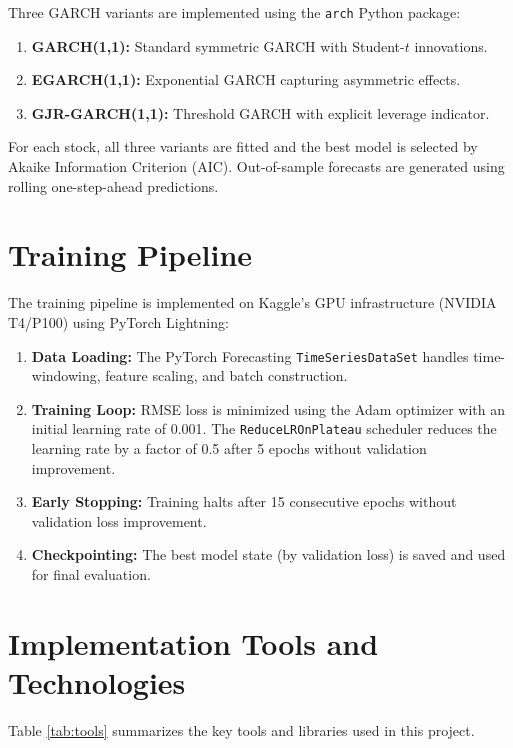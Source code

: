 Three GARCH variants are implemented using the \texttt{arch} Python package:

\begin{enumerate}
    \item \textbf{GARCH(1,1):} Standard symmetric GARCH with Student-$t$ innovations.
    \item \textbf{EGARCH(1,1):} Exponential GARCH capturing asymmetric effects.
    \item \textbf{GJR-GARCH(1,1):} Threshold GARCH with explicit leverage indicator.
\end{enumerate}

For each stock, all three variants are fitted and the best model is selected by Akaike Information Criterion (AIC). Out-of-sample forecasts are generated using rolling one-step-ahead predictions.

\section{Training Pipeline}

The training pipeline is implemented on Kaggle's GPU infrastructure (NVIDIA T4/P100) using PyTorch Lightning:

\begin{enumerate}
    \item \textbf{Data Loading:} The PyTorch Forecasting \texttt{TimeSeriesDataSet} handles time-windowing, feature scaling, and batch construction.
    \item \textbf{Training Loop:} RMSE loss is minimized using the Adam optimizer with an initial learning rate of 0.001. The \texttt{ReduceLROnPlateau} scheduler reduces the learning rate by a factor of 0.5 after 5 epochs without validation improvement.
    \item \textbf{Early Stopping:} Training halts after 15 consecutive epochs without validation loss improvement.
    \item \textbf{Checkpointing:} The best model state (by validation loss) is saved and used for final evaluation.
\end{enumerate}

\section{Implementation Tools and Technologies}

Table \ref{tab:tools} summarizes the key tools and libraries used in this project.

